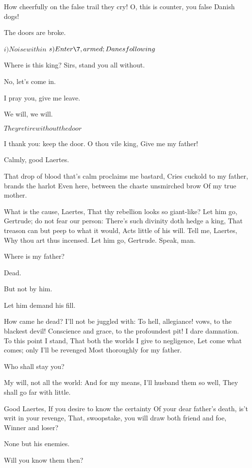 \documentclass[11pt]{book}
\begin{document}
\3	How cheerfully on the false trail they cry!
	O, this is counter, you false Danish dogs!

\2	The doors are broke.

	\(i)Noise within\)
	\(s)Enter \7, armed; Danes following\)

\7	Where is this king? Sirs, stand you all without.

	No, let's come in.

\7	                  I pray you, give me leave.

	We will, we will.

	\(They retire without the door\)

\7	I thank you: keep the door. O thou vile king,
	Give me my father!

\3	                  Calmly, good Laertes.

\7	That drop of blood that's calm proclaims me bastard,
	Cries cuckold to my father, brands the harlot
	Even here, between the chaste unsmirched brow
	Of my true mother.

\2	                  What is the cause, Laertes,
	That thy rebellion looks so giant-like?
	Let him go, Gertrude; do not fear our person:
	There's such divinity doth hedge a king,
	That treason can but peep to what it would,
	Acts little of his will. Tell me, Laertes,
	Why thou art thus incensed. Let him go, Gertrude.
	Speak, man.

\7	Where is my father?

\2	Dead.

\3	But not by him.

\2	Let him demand his fill.

\7	How came he dead? I'll not be juggled with:
	To hell, allegiance! vows, to the blackest devil!
	Conscience and grace, to the profoundest pit!
	I dare damnation. To this point I stand,
	That both the worlds I give to negligence,
	Let come what comes; only I'll be revenged
	Most thoroughly for my father.

\2	Who shall stay you?

\7	My will, not all the world:
	And for my means, I'll husband them so well,
	They shall go far with little.

\2	Good Laertes,
	If you desire to know the certainty
	Of your dear father's death, is't writ in your revenge,
	That, swoopstake, you will draw both friend and foe,
	Winner and loser?

\7	None but his enemies.

\2	Will you know them then?
\end{document}
